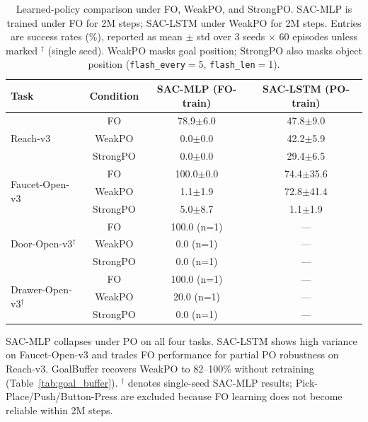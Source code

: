 \begin{table}[t]
\centering
\caption{Learned-policy comparison under FO, WeakPO, and StrongPO. SAC-MLP is trained under FO for 2M steps; SAC-LSTM under WeakPO for 2M steps. Entries are success rates (\%), reported as mean $\pm$ std over 3 seeds $\times$ 60 episodes unless marked $^\dagger$ (single seed). WeakPO masks goal position; StrongPO also masks object position (\texttt{flash\_every}$=$5, \texttt{flash\_len}$=$1).}
\label{tab:sac_baselines}
\begin{tabular}{l ccc}
\toprule
Task & Condition & SAC-MLP (FO-train) & SAC-LSTM (PO-train) \\
\midrule
\multirow{3}{*}{Reach-v3}
 & FO        & 78.9$\pm$6.0  & 47.8$\pm$9.0  \\
 & WeakPO    &  0.0$\pm$0.0  & 42.2$\pm$5.9  \\
 & StrongPO  &  0.0$\pm$0.0  & 29.4$\pm$6.5  \\
\midrule
\multirow{3}{*}{Faucet-Open-v3}
 & FO        & 100.0$\pm$0.0 & 74.4$\pm$35.6 \\
 & WeakPO    &   1.1$\pm$1.9 & 72.8$\pm$41.4 \\
 & StrongPO  &   5.0$\pm$8.7 &   1.1$\pm$1.9 \\
\midrule
\multirow{3}{*}{Door-Open-v3$^\dagger$}
 & FO        & 100.0 (n=1)   & ---            \\
 & WeakPO    &   0.0 (n=1)   & ---            \\
 & StrongPO  &   0.0 (n=1)   & ---            \\
\midrule
\multirow{3}{*}{Drawer-Open-v3$^\dagger$}
 & FO        & 100.0 (n=1)   & ---            \\
 & WeakPO    &  20.0 (n=1)   & ---            \\
 & StrongPO  &   0.0 (n=1)   & ---            \\
\bottomrule
\end{tabular}
\begin{flushleft}
\footnotesize SAC-MLP collapses under PO on all four tasks. SAC-LSTM shows high variance on Faucet-Open-v3 and trades FO performance for partial PO robustness on Reach-v3. GoalBuffer recovers WeakPO to 82--100\% without retraining (Table~\ref{tab:goal_buffer}). $^\dagger$ denotes single-seed SAC-MLP results; Pick-Place/Push/Button-Press are excluded because FO learning does not become reliable within 2M steps.
\end{flushleft}
\end{table}

